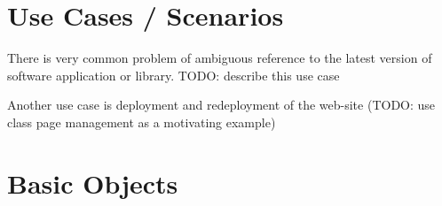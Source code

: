 \documentclass[11pt]{article}
\begin{document}

\section{Use Cases / Scenarios}
\label{sec:examples}


There is very common problem of ambiguous reference to the latest version of software application or library. TODO: describe this use case

Another use case is deployment and redeployment of the web-site (TODO: use class page management as a motivating example)




\section{Basic Objects}
\label{sec:objects}
\end{document}
